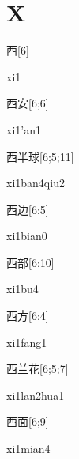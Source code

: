﻿%
\section*{X}

\begin{verbete}[xi1]{西}[6]
\begin{pronuncia}{xi1}
\end{pronuncia}
\end{verbete}

\begin{verbete}[xi1'an1]{西安}[6;6]
\begin{pronuncia}{xi1'an1}
\end{pronuncia}
\end{verbete}

\begin{verbete}{西半球}[6;5;11]
\begin{pronuncia}{xi1ban4qiu2}
\end{pronuncia}
\end{verbete}

\begin{verbete}[xi1bian0]{西边}[6;5]
\begin{pronuncia}{xi1bian0}
\end{pronuncia}
\end{verbete}

\begin{verbete}[xi1bu4]{西部}[6;10]
\begin{pronuncia}{xi1bu4}
\end{pronuncia}
\end{verbete}

\begin{verbete}[xi1fang1]{西方}[6;4]
\begin{pronuncia}{xi1fang1}
\end{pronuncia}
\end{verbete}

\begin{verbete}{西兰花}[6;5;7]
\begin{pronuncia}{xi1lan2hua1}
\end{pronuncia}
\end{verbete}

\begin{verbete}[xi1mian4]{西面}[6;9]
\begin{pronuncia}{xi1mian4}
\end{pronuncia}
\end{verbete}

